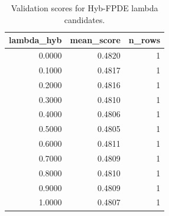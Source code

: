 \begin{table}[t]
\caption{Validation scores for Hyb-FPDE lambda candidates.}
\label{tab:lambda_distribution_computed}
\centering
\begin{tabular}{rrr}
\toprule
lambda\_hyb & mean\_score & n\_rows \\
\midrule
0.0000 & 0.4820 & 1 \\
0.1000 & 0.4817 & 1 \\
0.2000 & 0.4816 & 1 \\
0.3000 & 0.4810 & 1 \\
0.4000 & 0.4806 & 1 \\
0.5000 & 0.4805 & 1 \\
0.6000 & 0.4811 & 1 \\
0.7000 & 0.4809 & 1 \\
0.8000 & 0.4810 & 1 \\
0.9000 & 0.4809 & 1 \\
1.0000 & 0.4807 & 1 \\
\bottomrule
\end{tabular}

\end{table}
